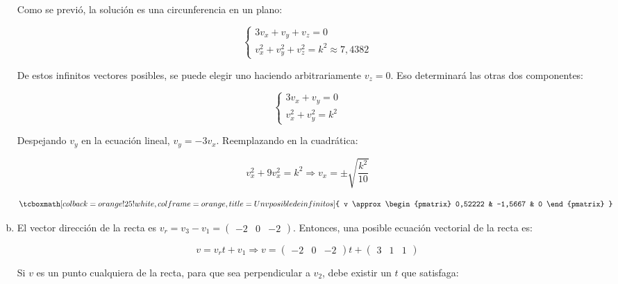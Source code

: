 \documentclass{article}
\begin{document}
\begin{enumerate}[(a)]
Como se previó, la solución es una circunferencia en un plano:

\begin{equation}
\left\{
\begin{array}{ll}
3 v_x + v_y + v_z = 0 \\
v_x^2 + v_y^2 + v_z^2 = k^2 \approx 7,4382
\end{array}
\right.
\end{equation}

De estos infinitos vectores posibles, se puede elegir uno haciendo arbitrariamente $v_z = 0$. Eso determinará las otras dos componentes:

\begin{equation}
\left\{
\begin{array}{ll}
3 v_x + v_y = 0 \\
v_x^2 + v_y^2 = k^2
\end{array}
\right.
\end{equation}

Despejando $v_y$ en la ecuación lineal, $v_y = -3 v_x$. Reemplazando en la cuadrática:

\begin{equation}
v_x^2 + 9 v_x^2 = k^2 \Rightarrow v_x = \pm \sqrt{\frac{k^2}{10}}
\end{equation}

\begin{equation}
\tcboxmath[colback=orange!25!white,colframe=orange,title=Un v posible de infinitos]
{ v \approx \begin{pmatrix}
0,52222 & -1,5667 & 0
\end{pmatrix} }
\end{equation}

\item El vector dirección de la recta es $v_r = v_3 - v_1 = \begin{pmatrix} -2 & 0 & -2 \end{pmatrix}$. Entonces, una posible ecuación vectorial de la recta es:

\begin{equation}
v = v_r t + v_1 \Rightarrow v = \begin{pmatrix} -2 & 0 & -2 \end{pmatrix} t + \begin{pmatrix} 3 & 1 & 1 \end{pmatrix}
\end{equation}

Si $v$ es un punto cualquiera de la recta, para que sea perpendicular a $v_2$, debe existir un $t$ que satisfaga:


\end{enumerate}
\end{document}
